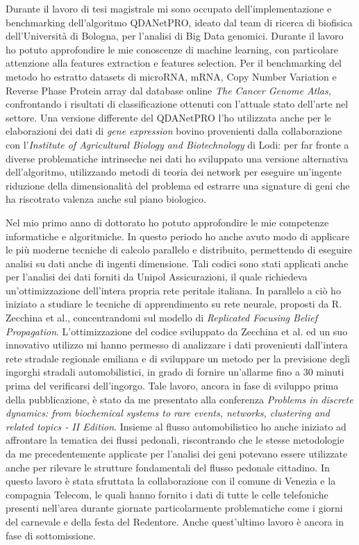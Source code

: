 \documentclass[a4paper,11pt]{article}
\begin{document}
Durante il lavoro di tesi magistrale mi sono occupato dell'implementazione e benchmarking dell'algoritmo QDANetPRO, ideato dal team di ricerca di biofisica dell'Università di Bologna, per l'analisi di Big Data genomici.
Durante il lavoro ho potuto approfondire le mie conoscenze di machine learning, con particolare attenzione alla features extraction e features selection.
Per il benchmarking del metodo ho estratto datasets di microRNA, mRNA, Copy Number Variation e Reverse Phase Protein array dal database online \emph{The Cancer Genome Atlas}, confrontando i risultati di classificazione ottenuti con l'attuale stato dell'arte nel settore.
Una versione differente del QDANetPRO l'ho utilizzata anche per le elaborazioni dei dati di \emph{gene expression} bovino provenienti dalla collaborazione con l'\emph{Institute of Agricultural Biology and Biotechnology} di Lodi: per far fronte a diverse problematiche intrinseche nei dati ho sviluppato una versione alternativa dell'algoritmo, utilizzando metodi di teoria dei network per eseguire un'ingente riduzione della dimensionalità del problema ed estrarre una signature di geni che ha riscotrato valenza anche sul piano biologico.

Nel mio primo anno di dottorato ho potuto approfondire le mie competenze informatiche e algoritmiche.
In questo periodo ho anche avuto modo di applicare le più moderne tecniche di calcolo parallelo e distribuito, permettendo di eseguire analisi su dati anche di ingenti dimensione.
Tali codici sono stati applicati anche per l'analisi dei dati forniti da Unipol Assicurazioni, il quale richiedeva un'ottimizzazione dell'intera propria rete peritale italiana.
In parallelo a ciò ho iniziato a studiare le tecniche di apprendimento su rete neurale, proposti da R. Zecchina et al., concentrandomi sul modello di \emph{Replicated Focusing Belief Propagation}.
L'ottimizzazione del codice sviluppato da Zecchina et al. ed un suo innovativo utilizzo mi hanno permesso di analizzare i dati provenienti dall'intera rete stradale regionale emiliana e di sviluppare un metodo per la previsione degli ingorghi stradali automobilistici, in grado di fornire un'allarme fino a 30 minuti prima del verificarsi dell'ingorgo.
Tale lavoro, ancora in fase di sviluppo prima della pubblicazione, %
è stato da me presentato alla conferenza \emph{Problems in discrete dynamics: from biochemical systems to rare events, networks, clustering and related topics - II Edition}.
Insieme al flusso automobilistico ho anche iniziato ad affrontare la tematica dei flussi pedonali, riscontrando che le stesse metodologie da me precedentemente applicate per l'analisi dei geni potevano essere utilizzate anche per rilevare le strutture fondamentali del flusso pedonale cittadino.
In questo lavoro è stata sfruttata la collaborazione con il comune di Venezia e la compagnia Telecom, le quali hanno fornito i dati di tutte le celle telefoniche presenti nell'area durante giornate particolarmente problematiche come i giorni del carnevale e della festa del Redentore.
Anche quest'ultimo lavoro è ancora in fase di sottomissione. %
\end{document}
